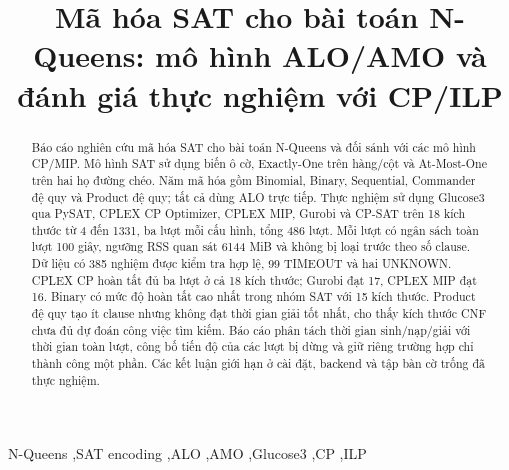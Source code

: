 \documentclass[a4paper,fleqn]{cas-sc}
\begin{document}
\let\WriteBookmarks\relax
\let\printorcid\relax
{}
\shortauthors{\AuthorName}
\title[mode=title]{Mã hóa SAT cho bài toán N-Queens: mô hình ALO/AMO và đánh giá thực nghiệm với CP/ILP}
\author[1]{\AuthorName}
\tnotemark[1]
\begin{abstract}
Báo cáo nghiên cứu mã hóa SAT cho bài toán N-Queens và đối sánh với các mô hình CP/MIP.
Mô hình SAT sử dụng biến ô cờ, Exactly-One trên hàng/cột và At-Most-One trên hai họ đường chéo.
Năm mã hóa gồm Binomial, Binary, Sequential, Commander đệ quy và Product đệ quy; tất cả dùng ALO trực tiếp.
Thực nghiệm sử dụng Glucose3 qua PySAT, CPLEX CP Optimizer, CPLEX MIP, Gurobi và CP-SAT trên 18 kích thước từ 4 đến 1331, ba lượt mỗi cấu hình, tổng 486 lượt.
Mỗi lượt có ngân sách toàn lượt 100 giây, ngưỡng RSS quan sát 6144 MiB và không bị loại trước theo số clause.
Dữ liệu có 385 nghiệm được kiểm tra hợp lệ, 99 TIMEOUT và hai UNKNOWN.
CPLEX CP hoàn tất đủ ba lượt ở cả 18 kích thước; Gurobi đạt 17, CPLEX MIP đạt 16. Binary có mức độ hoàn tất cao nhất trong nhóm SAT với 15 kích thước.
Product đệ quy tạo ít clause nhưng không đạt thời gian giải tốt nhất, cho thấy kích thước CNF chưa đủ dự đoán công việc tìm kiếm.
Báo cáo phân tách thời gian sinh/nạp/giải với thời gian toàn lượt, công bố tiến độ của các lượt bị dừng và giữ riêng trường hợp chỉ thành công một phần.
Các kết luận giới hạn ở cài đặt, backend và tập bàn cờ trống đã thực nghiệm.
\end{abstract}
\begin{keywords}
N-Queens \sep SAT encoding \sep ALO \sep AMO \sep Glucose3 \sep CP \sep ILP
\end{keywords}
\maketitle
{}


\FloatBarrier

\FloatBarrier

\FloatBarrier

\FloatBarrier


\end{document}
